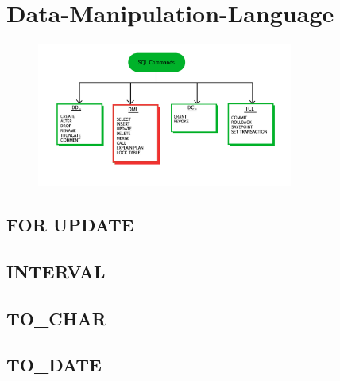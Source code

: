 \section[DML]{Data-Manipulation-Language}
\label{sec:dml}

\begin{figure}[h]
  \centering
  \includegraphics[width=0.75\textwidth]{img//sql-commands-dml.jpg}
  \label{img:dml}
\end{figure}

\subsection{FOR UPDATE}
\label{sec:dml.for_update}

\subsection{INTERVAL}
\label{sec:dml.interval}

\subsection{TO\_CHAR}
\label{sec:dml.to_char}

\subsection{TO\_DATE}
\label{sec:dml.to_date}
